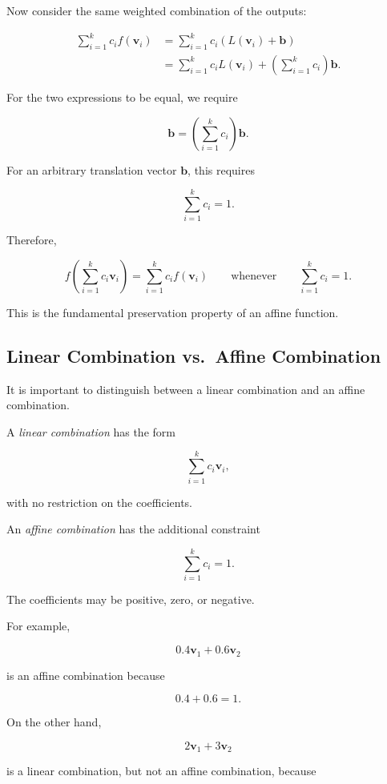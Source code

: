 \documentclass[12pt]{article}
\newcommand{\Vector}[1]{\mathbf{#1}}
\begin{document}
Now consider the same weighted combination of the outputs:

\begin{align*}
\sum_{i=1}^{k} c_i f(\Vector{v}_i)
&=
\sum_{i=1}^{k}
c_i\left(
    L(\Vector{v}_i)+\Vector{b}
\right)
\\[4pt]
&=
\sum_{i=1}^{k}c_iL(\Vector{v}_i)
+
\left(
    \sum_{i=1}^{k}c_i
\right)\Vector{b}.
\end{align*}

For the two expressions to be equal, we require

\[
\Vector{b}
=
\left(
    \sum_{i=1}^{k}c_i
\right)\Vector{b}.
\]

For an arbitrary translation vector $\Vector{b}$, this requires

\[
\boxed{
\sum_{i=1}^{k}c_i=1.
}
\]

Therefore,

\[
\boxed{
f\left(
    \sum_{i=1}^{k}c_i\Vector{v}_i
\right)
=
\sum_{i=1}^{k}c_i f(\Vector{v}_i)
\qquad
\text{whenever}
\qquad
\sum_{i=1}^{k}c_i=1.
}
\]

This is the fundamental preservation property of an affine function.

\subsection{Linear Combination vs.\ Affine Combination}

It is important to distinguish between a linear combination and an
affine combination.

A \emph{linear combination} has the form

\[
    \sum_{i=1}^{k}c_i\Vector{v}_i,
\]

with no restriction on the coefficients.

An \emph{affine combination} has the additional constraint

\[
    \boxed{
    \sum_{i=1}^{k}c_i=1.
    }
\]

The coefficients may be positive, zero, or negative.

For example,

\[
    0.4\Vector{v}_1+0.6\Vector{v}_2
\]

is an affine combination because

\[
    0.4+0.6=1.
\]

On the other hand,

\[
    2\Vector{v}_1+3\Vector{v}_2
\]

is a linear combination, but not an affine combination, because
\end{document}
